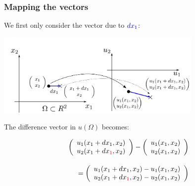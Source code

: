 \newpage

\subsubsection{Mapping the vectors}

\begin{frame}{\subsubsecname}

We first only consider the vector due to ${\color{blue}dx_1}$:

\svspace{-5mm}

\begin{center}
\includegraphics[width=0.75\textwidth]{img/x1.pdf}
\end{center}

\svspace{-3mm}

\pause

The difference vector in $u(\Omega)$ becomes:

\begin{equation}
\begin{array}{r}
\left( \begin{array}{rrrrrrrrrrrrrrrrrrrrrrrrrr} 
u_1 (x_1 + dx_1, x_2)\\
u_2 (x_1 + dx_{\color{red}1}, x_2)
\\ \end{array} \right) - 
\left( \begin{array}{rrrrrrrrrrrrrrrrrrrrrrrrrr} 
u_1 (x_1, x_2)\\
u_2 (x_1, x_2)
\\ \end{array} \right) \\[0.7cm]
=
\left( \begin{array}{rrrrrrrrrrrrrrrrrrrrrrrrrr} 
u_1 (x_1 + dx_1, x_2) - u_1 (x_1, x_2)\\
u_2 (x_1 + dx_{\color{red}1}, x_2) - u_2 (x_1, x_2)
\\ \end{array} \right)
\end{array}
\end{equation}

\end{frame}

